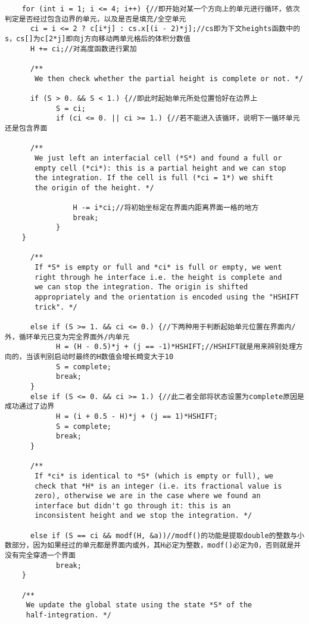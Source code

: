 \documentclass[lang=cn,11pt,a4paper]{elegantpaper}
\begin{document}
\begin{verbatim}
    for (int i = 1; i <= 4; i++) {//即开始对某一个方向上的单元进行循环，依次判定是否经过包含边界的单元，以及是否是填充/全空单元
      ci = i <= 2 ? c[i*j] : cs.x[(i - 2)*j];//cs即为下文heights函数中的s，cs[]为c[2*j]即向j方向移动两单元格后的体积分数值
      H += ci;//对高度函数进行累加
      
      /**
       We then check whether the partial height is complete or not. */
      
      if (S > 0. && S < 1.) {//即此时起始单元所处位置恰好在边界上
            S = ci;
            if (ci <= 0. || ci >= 1.) {//若不能进入该循环，说明下一循环单元还是包含界面
      
      /**
       We just left an interfacial cell (*S*) and found a full or
       empty cell (*ci*): this is a partial height and we can stop
       the integration. If the cell is full (*ci = 1*) we shift
       the origin of the height. */
    
                H -= i*ci;//将初始坐标定在界面内距离界面一格的地方
                break;
            }
    }
      
      /**
       If *S* is empty or full and *ci* is full or empty, we went
       right through he interface i.e. the height is complete and
       we can stop the integration. The origin is shifted
       appropriately and the orientation is encoded using the "HSHIFT
       trick". */
      
      else if (S >= 1. && ci <= 0.) {//下两种用于判断起始单元位置在界面内/外，循环单元已变为完全界面外/内单元
            H = (H - 0.5)*j + (j == -1)*HSHIFT;//HSHIFT就是用来辨别处理方向的，当该判别启动时最终的H数值会增长畸变大于10
            S = complete;
            break;
      }
      else if (S <= 0. && ci >= 1.) {//此二者全部将状态设置为complete原因是成功通过了边界
            H = (i + 0.5 - H)*j + (j == 1)*HSHIFT;
            S = complete;
            break;
      }
      
      /**
       If *ci* is identical to *S* (which is empty or full), we
       check that *H* is an integer (i.e. its fractional value is
       zero), otherwise we are in the case where we found an
       interface but didn't go through it: this is an
       inconsistent height and we stop the integration. */
      
      else if (S == ci && modf(H, &a))//modf()的功能是提取double的整数与小数部分，因为如果经过的单元都是界面内或外，其H必定为整数，modf()必定为0，否则就是并没有完全穿透一个界面
            break;
    }

    /**
     We update the global state using the state *S* of the
     half-integration. */
    

\end{verbatim}
\end{document}

